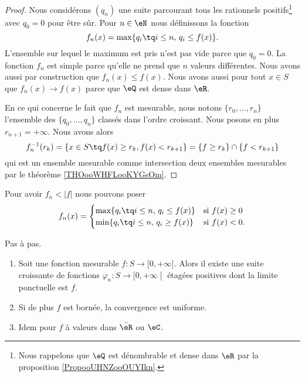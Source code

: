 \begin{proof}
    Nous considérons \( (q_n)\) une suite parcourant tous les rationnels positifs\footnote{Nous rappelons que \( \eQ\) est dénombrable et dense dans \( \eR\) par la proposition \ref{PropooUHNZooOUYIkn}.} avec \( q_0=0\) pour être sûr.
    Pour \( n\in \eN\) nous définissons la fonction
    \begin{equation}        \label{EqooXQYIooSSJwtM}
        f_n(x)= \max\{ q_i\tq i\leq n,\, q_i\leq f(x) \}.
    \end{equation}
    L'ensemble sur lequel le maximum est pris n'est pas vide parce que \( q_0=0\). La fonction \( f_n\) est simple parce qu'elle ne prend que \( n\) valeurs différentes. Nous avons aussi par construction que \(  f_n(x)\leq f(x) \). Nous avons aussi pour tout \( x\in S\) que \( f_n(x)\to f(x)\) parce que \( \eQ\) est dense dans \( \eR\).

    En ce qui concerne le fait que \( f_n\) est mesurable, nous notons \( \{ r_0,\ldots, r_{n} \}\) l'ensemble des \( \{ q_0,\ldots, q_n \}\) classés dans l'ordre croissant. Nous posons en plus \( r_{n+1}=+\infty\). Nous avons alors
    \begin{equation}
        f_n^{-1}(r_k)=\{ x\in S\tq f(x)\geq r_k,f(x)<r_{k+1} \}=\{ f\geq r_k \}\cap\{ f<r_{k+1} \}
    \end{equation}
    qui est un ensemble mesurable comme intersection deux ensembles mesurables par le théorème \ref{THOooWHFLooKYGsOm}.
\end{proof}

\begin{remark}
    Pour avoir \(  f_n <| f |\) nous pouvons poser
    \begin{equation}
        f_n(x)=\begin{cases}
            \max\{ q_i\tq i\leq n,\, q_i\leq f(x) \}    &   \text{si \( f(x)\geq 0\)}\\
            \min\{ q_i\tq i\leq n,\, q_i\geq f(x) \}    &    \text{si \( f(x)< 0\).}
        \end{cases}
    \end{equation}
\end{remark}

\begin{theorem}\label{THOooXHIVooKUddLi}
    Pas à pas.
    \begin{enumerate}
        \item
    Soit une fonction mesurable \( f\colon S\to \mathopen[ 0 , +\infty \mathclose]\). Alors il existe une suite croissante de fonctions \( \varphi_n\colon S\to \mathopen[ 0 , +\infty \mathclose[\) étagées positives dont la limite ponctuelle est \( f\).
    \item
        Si de plus \( f\) est bornée, la convergence est uniforme.
    \item
        Idem pour \( f\) à valeurs dans \( \bar \eR\) ou \( \eC\).
    \end{enumerate}
\end{theorem}


